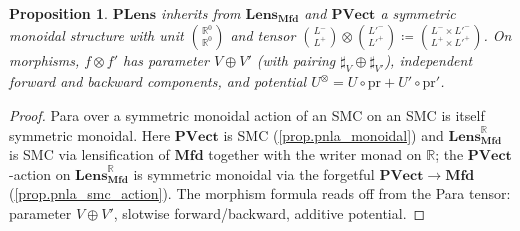 \documentclass[11pt, oneside, article]{memoir}
\theoremstyle{definition}
\theoremstyle{plain}
\newtheorem{proposition}[proposition]{Proposition}
\newcommand{\Cat}[1]{\mathbf{#1}}%
\newcommand{\fun}[1]{\mathrm{#1}}%
\newcommand{\rr}{\mathbb{R}}
\newcommand{\mfd}{\Cat{Mfd}}
\newcommand{\pr}{\fun{pr}}
\newcommand{\potlens}{\Cat{PLens}}
\newcommand{\pvect}{\Cat{PVect}}
\newcommand{\Lens}[1]{\Cat{Lens}_{#1}}
\newcommand{\lmfd}{\Lens{\mfd}}
\newcommand{\inpt}[1]{#1^{-}}
\newcommand{\outp}[1]{#1^{+}}
\newcommand{\lensob}[1]{\binom{\inpt{#1}}{\outp{#1}}}%
\newcommand{\lensobs}[2]{\binom{\inpt{#1}\times\inpt{#2}}{\outp{#1}\times\outp{#2}}}%
\begin{document}
\begin{proposition}\label{prop.potlens_monoidal}
$\potlens$ inherits from $\lmfd$ and $\pvect$ a symmetric monoidal structure with unit $\binom{\rr^0}{\rr^0}$ and tensor $\lensob L\otimes\lensob{L'}\coloneqq\lensobs{L}{L'}$. On morphisms, $f\otimes f'$ has parameter $V\oplus V'$ (with pairing $\sharp_V\oplus\sharp_{V'}$), independent forward and backward components, and potential $U^\otimes=U\circ\pr+U'\circ\pr'$.
\end{proposition}

\begin{proof}
Para over a symmetric monoidal action of an SMC on an SMC is itself symmetric monoidal. Here $\pvect$ is SMC (\cref{prop.pnla_monoidal}) and $\lmfd^\rr$ is SMC via lensification of $\mfd$ together with the writer monad on $\rr$; the $\pvect$-action on $\lmfd^\rr$ is symmetric monoidal via the forgetful $\pvect\to\mfd$ (\cref{prop.pnla_smc_action}). The morphism formula reads off from the Para tensor: parameter $V\oplus V'$, slotwise forward/backward, additive potential.\qedhere
\end{proof}
\end{document}
